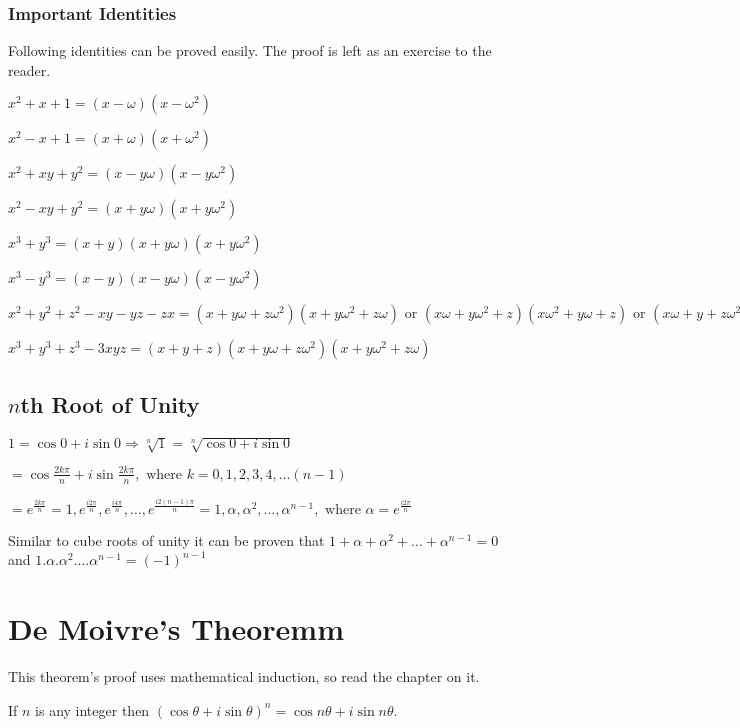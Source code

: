 \subsubsection{Important Identities}
Following identities can be proved easily. The proof is left as an exercise to the reader.
\startitemize[n]
\item $x^2 + x + 1 = (x - \omega)(x - \omega^2)$
\item $x^2 - x + 1 = (x + \omega)(x + \omega^2)$
\item $x^2 + xy + y^2 = (x - y\omega)(x - y\omega^2)$
\item $x^2 - xy + y^2 = (x + y\omega)(x + y\omega^2)$
\item $x^3 + y^3 = (x + y)(x + y\omega)(x + y\omega^2)$
\item $x^3 - y^3 = (x - y)(x - y\omega)(x - y\omega^2)$
\item $x^2 + y^2 + z^2 - xy - yz - zx = (x + y\omega + z\omega^2)(x + y\omega^2 + z\omega) \text{~or~} (x\omega + y\omega^2 +
  z)(x\omega^2 + y\omega + z)
  \text{~or~}(x\omega + y + z\omega^2)(x\omega^2 + y + z\omega)$
\item $x^3 + y^3 + z^3 - 3xyz = (x + y + z)(x + y\omega + z\omega^2)(x+ y\omega^2 + z\omega)$
\stopitemize

\subsection{$n$th Root of Unity}
$1 = \cos0 + i\sin 0 \Rightarrow \sqrt[n]{1} = \sqrt[n]{\cos0 + i\sin0}$

\noindent $=\cos\frac{2k\pi}{n} + i\sin\frac{2k\pi}{n}, \text{~where~} k = 0, 1, 2, 3, 4, \ldots (n - 1)$

\noindent $= e^{\frac{2k\pi}{n}} = 1, e^{\frac{i2\pi}{n}}, e^{\frac{i4\pi}{n}}, \ldots, e^{\frac{i2(n - 1)\pi}{n}} = 1, \alpha, \alpha^2,
\ldots, \alpha^{n - 1}, \text{~where~}\alpha = e^{\frac{i2\pi}{n}}$

\noindent Similar to cube roots of unity it can be proven that $1 + \alpha + \alpha^2 + \ldots + \alpha^{n - 1} = 0$
and $1.\alpha.\alpha^2.\ldots\alpha^{n - 1} = (-1)^{n - 1}$

\section{De Moivre's Theoremm}
This theorem's proof uses mathematical induction, so read the chapter on it.

 If $n$ is any integer then $(\cos\theta + i\sin\theta)^n = \cos n\theta + i\sin n\theta$.

